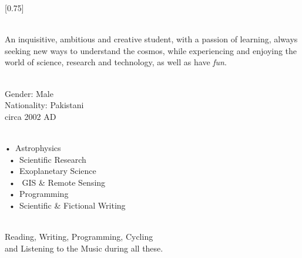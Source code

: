 \documentclass[lighthipster]{simplehipstercv}
\begin{document}
\setlength{\columnsep}{1.5cm}
[0.75]
\begin{paracol}{2}

\paracolbackgroundoptions



\footnotesize
{\setasidefontcolour
\flushright

\vspace{14.5em}
\\[0.5em]

{\footnotesize
An inquisitive, ambitious and creative student, with a passion of learning, always seeking new ways to 
understand the cosmos, while experiencing and enjoying the world of science, research and technology, as well as have \emph{fun}.
}
\bigskip


 \\[0.5em]
Gender: Male \\
Nationality: Pakistani \\
circa 2002 AD\\

\bigskip

 \\[0.5em]

•~Astrophysics \\~•~Scientific Research\\~•~Exoplanetary Science\\~•~ GIS \& Remote Sensing \\~•~Programming\\~•~Scientific \& Fictional Writing

\bigskip


\\[0.5em]

Reading, Writing, Programming, Cycling \\and Listening to the Music during all these.

\bigskip

\vspace{3em}

}
\end{paracol}
\end{document}
